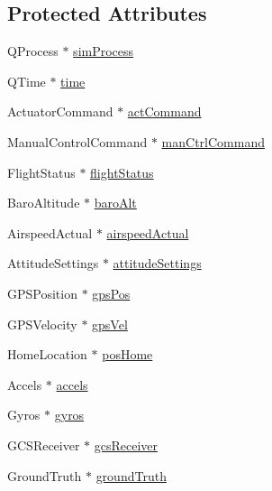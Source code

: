 \subsection*{\-Protected \-Attributes}
\begin{DoxyCompactItemize}
\item 
\-Q\-Process $\ast$ \hyperlink{group___h_i_t_l_plugin_ga28f5833f779eb659394e6c6cfe6f2331}{sim\-Process}
\item 
\-Q\-Time $\ast$ \hyperlink{group___h_i_t_l_plugin_ga162228fbfec7737c989bfe0b340e8617}{time}
\item 
\-Actuator\-Command $\ast$ \hyperlink{group___h_i_t_l_plugin_ga9362d7e2619934460d6f8070496d336f}{act\-Command}
\item 
\-Manual\-Control\-Command $\ast$ \hyperlink{group___h_i_t_l_plugin_ga1af06e35c7befb4f3ffd0bfee9a6efc2}{man\-Ctrl\-Command}
\item 
\-Flight\-Status $\ast$ \hyperlink{group___h_i_t_l_plugin_ga2c3a29dc6471574d7182db7691e69a56}{flight\-Status}
\item 
\-Baro\-Altitude $\ast$ \hyperlink{group___h_i_t_l_plugin_ga107f3bf3d4cc0c45cc8677742d4445eb}{baro\-Alt}
\item 
\-Airspeed\-Actual $\ast$ \hyperlink{group___h_i_t_l_plugin_gadba0d3a66c5a15e0027b7d95fc9498b4}{airspeed\-Actual}
\item 
\-Attitude\-Settings $\ast$ \hyperlink{group___h_i_t_l_plugin_ga4430b724d2151ce662d6b82a3b8ba74a}{attitude\-Settings}
\item 
\-G\-P\-S\-Position $\ast$ \hyperlink{group___h_i_t_l_plugin_gae4d6ea654494f0de351686d9c35037ca}{gps\-Pos}
\item 
\-G\-P\-S\-Velocity $\ast$ \hyperlink{group___h_i_t_l_plugin_ga649eab8811fb3f1e6596e48eac2d47c7}{gps\-Vel}
\item 
\-Home\-Location $\ast$ \hyperlink{group___h_i_t_l_plugin_ga9fcd56565e3cb4d64bc0c71c0a6151c1}{pos\-Home}
\item 
\-Accels $\ast$ \hyperlink{group___h_i_t_l_plugin_ga35cb24cdab1cfc0d1720b5b58fd0254f}{accels}
\item 
\-Gyros $\ast$ \hyperlink{group___h_i_t_l_plugin_ga0f9daef3b0fe0731e035f2bff3d9df19}{gyros}
\item 
\-G\-C\-S\-Receiver $\ast$ \hyperlink{group___h_i_t_l_plugin_gac63d17091bc4377e1b49696355a0ae19}{gcs\-Receiver}
\item 
\-Ground\-Truth $\ast$ \hyperlink{group___h_i_t_l_plugin_ga6c62059f6d424f96ad1142bfe8885e3a}{ground\-Truth}
\item 

\end{DoxyCompactItemize}
